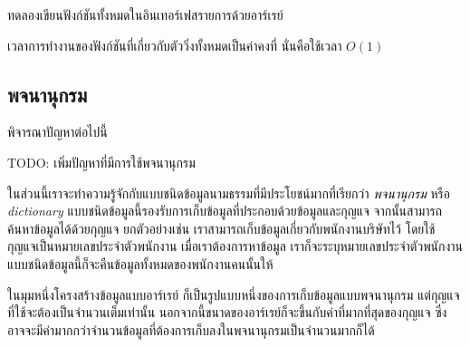 \begin{quiz}{}
ทดลอง{\wbr}เขียน{\wbr}ฟังก์ชัน{\wbr}ทั้งหมด{\wbr}ใน{\wbr}อิน{\wbr}เทอร์เฟส{\wbr}รายการ{\wbr}ด้วย{\wbr}อาร์เรย์
\end{quiz}

เวลา{\wbr}การ{\wbr}ทำงาน{\wbr}ของ{\wbr}ฟังก์ชัน{\wbr}ที่{\wbr}เกี่ยวกับ{\wbr}ตัว{\wbr}วิ่ง{\wbr}ทั้งหมด{\wbr}เป็น{\wbr}ค่าคงที่ นั่น{\wbr}คือ{\wbr}ใช้เวลา $O(1)$ 

\subsection{พจนานุกรม}
พิจารณา{\wbr}ปัญหา{\wbr}ต่อไปนี้{\wbr}

\begin{prob}{}
TODO: เพิ่ม{\wbr}ปัญหา{\wbr}ที่{\wbr}มี{\wbr}การ{\wbr}ใช้{\wbr}พจนานุกรม{\wbr}
\end{prob}

ใน{\wbr}ส่วน{\wbr}นี้{\wbr}เรา{\wbr}จะ{\wbr}ทำ{\wbr}ความ{\wbr}รู้จัก{\wbr}กับ{\wbr}แบบ{\wbr}ชนิด{\wbr}ข้อมูล{\wbr}นามธรรม{\wbr}ที่{\wbr}มี{\wbr}ประโยชน์{\wbr}มาก{\wbr}ที่{\wbr}เรียก{\wbr}ว่า {\em
  พจนานุกรม} หรือ {\em dictionary}
แบบ{\wbr}ชนิด{\wbr}ข้อมูล{\wbr}นี้{\wbr}รองรับ{\wbr}การ{\wbr}เก็บ{\wbr}ข้อมูล{\wbr}ที่{\wbr}ประกอบ{\wbr}ด้วย{\wbr}ข้อมูล{\wbr}และ{\wbr}กุญแจ{\wbr}
จากนั้น{\wbr}สามารถ{\wbr}ค้นหา{\wbr}ข้อมูล{\wbr}ได้{\wbr}ด้วย{\wbr}กุญแจ ยก{\wbr}ตัวอย่าง{\wbr}เช่น{\wbr}
เรา{\wbr}สามารถ{\wbr}เก็บ{\wbr}ข้อมูล{\wbr}เกี่ยวกับ{\wbr}พนักงาน{\wbr}บริษัท{\wbr}ไว้ โดย{\wbr}ใช้{\wbr}กุญแจ{\wbr}เป็น{\wbr}หมายเลข{\wbr}ประจำตัว{\wbr}พนักงาน{\wbr}
เมื่อ{\wbr}เรา{\wbr}ต้องการ{\wbr}หา{\wbr}ข้อมูล เรา{\wbr}ก็{\wbr}จะ{\wbr}ระบุ{\wbr}หมายเลข{\wbr}ประจำตัว{\wbr}พนักงาน{\wbr}
แบบ{\wbr}ชนิด{\wbr}ข้อมูล{\wbr}นี้{\wbr}ก็{\wbr}จะ{\wbr}คืน{\wbr}ข้อมูล{\wbr}ทั้งหมด{\wbr}ของ{\wbr}พนักงาน{\wbr}คน{\wbr}นั้น{\wbr}ให้{\wbr}

ใน{\wbr}มุม{\wbr}หนึ่ง{\wbr}โครงสร้าง{\wbr}ข้อมูล{\wbr}แบบ{\wbr}อาร์เรย์ ก็{\wbr}เป็น{\wbr}รูปแบบ{\wbr}หนึ่ง{\wbr}ของ{\wbr}การ{\wbr}เก็บ{\wbr}ข้อมูล{\wbr}แบบ{\wbr}พจนานุกรม{\wbr}
แต่{\wbr}กุญแจ{\wbr}ที่{\wbr}ใช้{\wbr}จะ{\wbr}ต้อง{\wbr}เป็น{\wbr}จำนวนเต็ม{\wbr}เท่านั้น{\wbr}
นอกจากนี้{\wbr}ขนาด{\wbr}ของ{\wbr}อาร์เรย์{\wbr}ก็{\wbr}จะ{\wbr}ขึ้น{\wbr}กับ{\wbr}ค่า{\wbr}ที่{\wbr}มาก{\wbr}ที่สุด{\wbr}ของ{\wbr}กุญแจ{\wbr}
ซึ่ง{\wbr}อาจ{\wbr}จะ{\wbr}มี{\wbr}ค่า{\wbr}มาก{\wbr}กว่า{\wbr}จำนวน{\wbr}ข้อมูล{\wbr}ที่{\wbr}ต้องการ{\wbr}เก็บ{\wbr}ลง{\wbr}ใน{\wbr}พจนานุกรม{\wbr}เป็น{\wbr}จำนวน{\wbr}มาก{\wbr}ก็ได้{\wbr}

